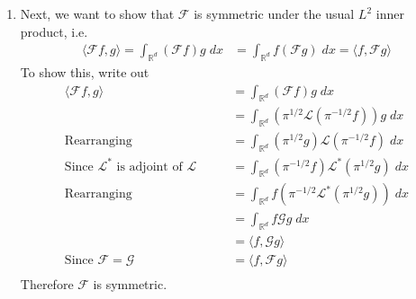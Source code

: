 \documentclass[12pt]{article}
\theoremstyle{plain}
\theoremstyle{definition}
\theoremstyle{remark}
\begin{document}
\begin{enumerate}
\begin{enumerate}
      \item %
        Next, we want to show that $\mathscr{F}$ is symmetric under the
        usual $L^2$ inner product, i.e.
        \begin{align*}
          \langle \mathscr{F}f, g\rangle
            =\int_{\mathbb{R}^d} (\mathscr{F}f) g \; dx
          &=
            \int_{\mathbb{R}^d} f (\mathscr{F}g) \; dx
            =\langle f, \mathscr{F}g\rangle
        \end{align*}
        To show this, write out
        \begin{align*}
          \langle \mathscr{F}f, g\rangle
            &=\int_{\mathbb{R}^d} (\mathscr{F}f) g \; dx\\
            &=\int_{\mathbb{R}^d} \left( \pi^{1/2} \mathscr{L}( \pi^{-1/2} f)\right) g \; dx\\
            \text{Rearranging} \qquad
            &=\int_{\mathbb{R}^d}  (\pi^{1/2} g) \mathscr{L} \left(\pi^{-1/2} f\right)  \; dx\\
            \text{Since $\mathscr{L}^*$ is adjoint of $\mathscr{L}$} \qquad
            &=\int_{\mathbb{R}^d} \left(\pi^{-1/2} f\right) \mathscr{L^*} (\pi^{1/2} g)   \; dx\\
            \text{Rearranging} \qquad
            &=\int_{\mathbb{R}^d}  f \left(\pi^{-1/2} \mathscr{L^*} (\pi^{1/2} g) \right)  \; dx\\
            &=\int_{\mathbb{R}^d}  f \mathscr{G}g   \; dx\\
            &= \langle f, \mathscr{G}g\rangle\\
            \text{Since $\mathscr{F}=\mathscr{G}$}\qquad
            &= \langle f, \mathscr{F}g \rangle\\
        \end{align*}
        Therefore $\mathscr{F}$ is symmetric.
    \end{enumerate}


\end{enumerate}
\end{document}
